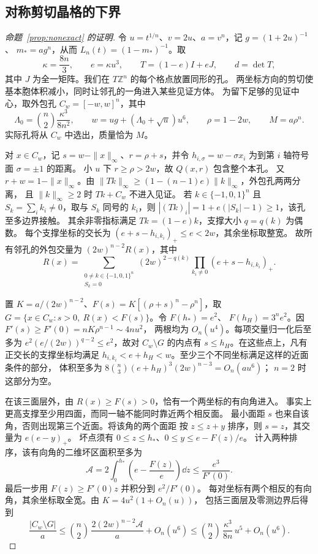 \subsection{对称剪切晶格的下界}

\begin{proof}[命题~\ref{prop:nonexact} 的证明]
令 \(u=t^{1/n}\)、\(v=2u\)、\(a=v^n\)，记 \(g=(1+2u)^{-1}\)、
\(m_*=ag^n\)，从而 \(L_n(t)=(1-m_*)^{-1}\)。取
\[
 \kappa=\frac{8n}{3},\qquad e=\kappa u^3,\qquad
 T=(1-e)I+eJ,\qquad d=\det T ,
\]
其中 \(J\) 为全一矩阵。我们在 \(T\mathbb Z^n\) 的每个格点放置同形的孔。
两坐标方向的剪切使基本胞体积减小，同时让邻孔的一角进入某些见证方体。
为留下足够的见证中心，取外包孔 \(C_w=[-w,w]^n\)，其中
\[
 \Lambda_0=\binom n2\frac{\kappa^3}{8n^2},\qquad
 w=ug+(\Lambda_0+\sqrt u)u^6,\qquad \rho=1-2w,\qquad M=a\rho^n .
\]
实际孔将从 \(C_w\) 中选出，质量恰为 \(M\)。

对 \(x\in C_w\)，记 \(s=w-\|x\|_\infty\)、\(r=\rho+s\)，并令
\(h_{i,\sigma}=w-\sigma x_i\) 为到第 \(i\) 轴符号面 \(\sigma=\pm1\) 的距离。
小 \(u\) 下 \(r\ge\rho>2w\)，故 \(Q(x,r)\) 包含整个本孔。
又 \(r+w=1-\|x\|_\infty\)。由
\(\|Tk\|_\infty\ge(1-(n-1)e)\|k\|_\infty\)，外包孔两两分离，
且 \(\|k\|_\infty\ge2\) 时 \(Tk+C_w\) 不进入见证。
若 \(k\in\{-1,0,1\}^n\) 且 \(S_k=\sum_i k_i\ne0\)，取与 \(S_k\) 同号的
\(k_i\)，则 \(|(Tk)_i|=1+e(|S_k|-1)\ge1\)，该孔至多边界接触。
其余非零指标满足 \(Tk=(1-e)k\)，支撑大小 \(q=q(k)\) 为偶数。
每个支撑坐标的交长为 \((e+s-h_{i,k_i})_+\le e<2w\)，其余坐标取整宽。
故所有邻孔的外包交量为 \((2w)^{n-2}R(x)\)，其中
\[
 R(x)=\sum_{\substack{0\ne k\in\{-1,0,1\}^n\\ S_k=0}}
 (2w)^{2-q(k)}\prod_{k_i\ne0}(e+s-h_{i,k_i})_+ .
\]

置 \(K=a/(2w)^{n-2}\)、\(F(s)=K[(\rho+s)^n-\rho^n]\)，取
\(G=\{x\in C_w:s>0,\ R(x)<F(s)\}\)。令 \(F(h_*)=e^2\)、
\(F(h_H)=3^n e^2\)。因 \(F'(s)\ge F'(0)=nK\rho^{n-1}\sim4nu^2\)，
两根均为 \(O_n(u^4)\)。每项交量归一化后至多为
\(e^2(e/(2w))^{q-2}\le e^2\)，故对 \(C_w\setminus G\) 的内点有
\(s\le h_H\)。在这些点上，凡有正交长的支撑坐标均满足
\(h_{i,k_i}<e+h_H<w\)。至少三个不同坐标满足这样的近面条件的部分，
体积至多为 \(8\binom n3(e+h_H)^3(2w)^{n-3}=O_n(a u^6)\)；
\(n=2\) 时这部分为空。

在该三面层外，由 \(R(x)\ge F(s)>0\)，恰有一个两坐标的有向角进入。
事实上更高支撑至少用四面，而同一轴不能同时靠近两个相反面。
最小面距 \(s\) 也来自该角，否则出现第三个近面。将该角的两个面距
按 \(z\le z+y\) 排序，则 \(s=z\)，其交量为 \(e(e-y)_+\)。
坏点须有 \(0\le z\le h_*\)、\(0\le y\le e-F(z)/e\)。
计入两种排序，该有向角的二维坏区面积至多为
\[
 \mathscr A=2\int_0^{h_*}\left(e-\frac{F(z)}e\right)\dd z
 \le\frac{e^3}{F'(0)} .
\]
最后一步用 \(F(z)\ge F'(0)z\) 并积分到 \(e^2/F'(0)\)。
每对坐标有两个相反的有向角，其余坐标取全宽。由 \(K=4u^2(1+O_n(u))\)，
包括三面层及零测边界后得到
\[
 \frac{|C_w\setminus G|}{a}
 \le \binom n2\,\frac{2(2w)^{n-2}\mathscr A}{a}+O_n(u^6)
 \le \binom n2\,\frac{\kappa^3}{8n}\,u^5+O_n(u^6).
\]


\end{proof}

